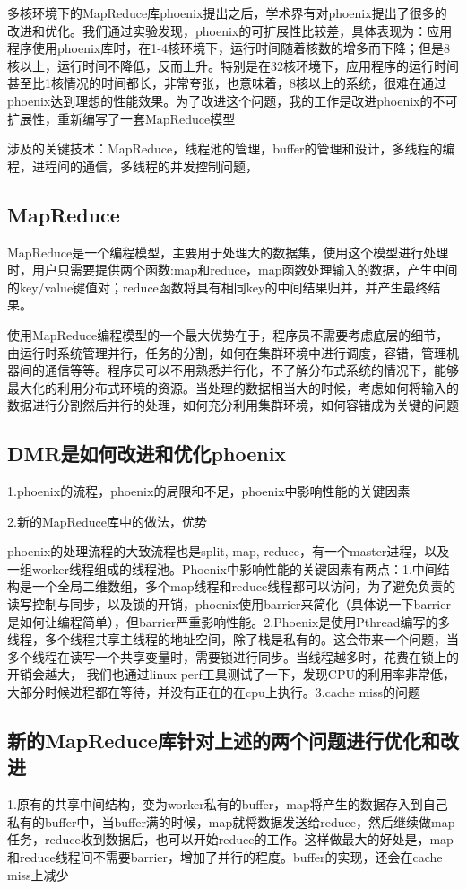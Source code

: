 多核环境下的MapReduce库phoenix提出之后，学术界有对phoenix提出了很多的改进和优化。我们通过实验发现，phoenix的可扩展性比较差，具体表现为：应用程序使用phoenix库时，在1-4核环境下，运行时间随着核数的增多而下降；但是8核以上，运行时间不降低，反而上升。特别是在32核环境下，应用程序的运行时间甚至比1核情况的时间都长，非常夸张，也意味着，8核以上的系统，很难在通过phoenix达到理想的性能效果。为了改进这个问题，我的工作是改进phoenix的不可扩展性，重新编写了一套MapReduce模型

涉及的关键技术：MapReduce，线程池的管理，buffer的管理和设计，多线程的编程，进程间的通信，多线程的并发控制问题，

\subsection{MapReduce}
MapReduce是一个编程模型，主要用于处理大的数据集，使用这个模型进行处理时，用户只需要提供两个函数:map和reduce，map函数处理输入的数据，产生中间的key/value键值对；reduce函数将具有相同key的中间结果归并，并产生最终结果。

使用MapReduce编程模型的一个最大优势在于，程序员不需要考虑底层的细节，由运行时系统管理并行，任务的分割，如何在集群环境中进行调度，容错，管理机器间的通信等等。程序员可以不用熟悉并行化，不了解分布式系统的情况下，能够最大化的利用分布式环境的资源。当处理的数据相当大的时候，考虑如何将输入的数据进行分割然后并行的处理，如何充分利用集群环境，如何容错成为关键的问题

\subsection{DMR是如何改进和优化phoenix}
1.phoenix的流程，phoenix的局限和不足，phoenix中影响性能的关键因素

2.新的MapReduce库中的做法，优势


phoenix的处理流程的大致流程也是split, map, reduce，有一个master进程，以及一组worker线程组成的线程池。Phoenix中影响性能的关键因素有两点：1.中间结构是一个全局二维数组，多个map线程和reduce线程都可以访问，为了避免负责的读写控制与同步，以及锁的开销，phoenix使用barrier来简化（具体说一下barrier是如何让编程简单），但barrier严重影响性能。2.Phoenix是使用Pthread编写的多线程，多个线程共享主线程的地址空间，除了栈是私有的。这会带来一个问题，当多个线程在读写一个共享变量时，需要锁进行同步。当线程越多时，花费在锁上的开销会越大， 我们也通过linux perf工具测试了一下，发现CPU的利用率非常低，大部分时候进程都在等待，并没有正在的在cpu上执行。3.cache miss的问题

\subsection{新的MapReduce库针对上述的两个问题进行优化和改进}
1.原有的共享中间结构，变为worker私有的buffer，map将产生的数据存入到自己私有的buffer中，当buffer满的时候，map就将数据发送给reduce，然后继续做map任务，reduce收到数据后，也可以开始reduce的工作。这样做最大的好处是，map和reduce线程间不需要barrier，增加了并行的程度。buffer的实现，还会在cache miss上减少

